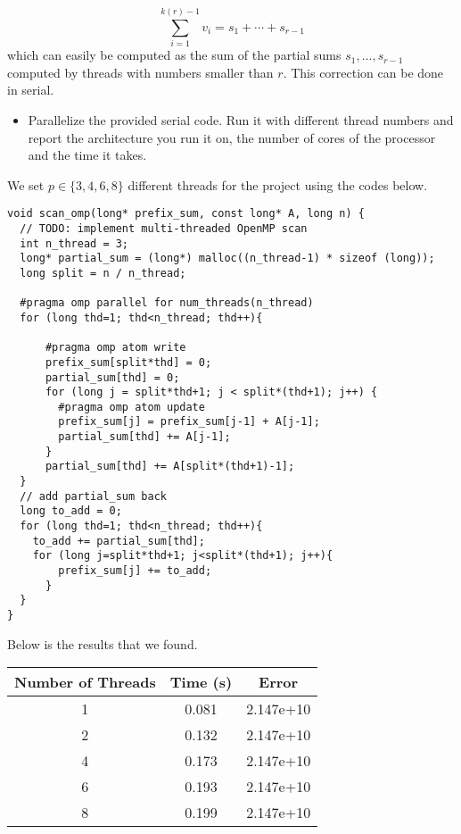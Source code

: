 \documentclass[12pt]{article}
\begin{document}
\begin{enumerate}
    $$
    \sum_{i=1}^{k(r)-1} v_i = s_1 + \cdots + s_{r-1}
    $$
    which can easily be computed as the sum of the partial sums
    $s_1,\ldots,s_{r-1}$ computed by threads with numbers smaller than
    $r$.  This correction can be done in serial.
    \begin{itemize}
    \item Parallelize the provided serial code. Run it with different
      thread numbers and report the architecture you run it on, the
      number of cores of the processor and the time it takes.
    \end{itemize}
\newpage
We set $p\in\{3,4,6,8\}$ different threads for the project using the codes below.
\begin{verbatim}
void scan_omp(long* prefix_sum, const long* A, long n) {
  // TODO: implement multi-threaded OpenMP scan
  int n_thread = 3;
  long* partial_sum = (long*) malloc((n_thread-1) * sizeof (long));
  long split = n / n_thread;
  
  #pragma omp parallel for num_threads(n_thread)
  for (long thd=1; thd<n_thread; thd++){
  	
  	  #pragma omp atom write
  	  prefix_sum[split*thd] = 0;
  	  partial_sum[thd] = 0;
	  for (long j = split*thd+1; j < split*(thd+1); j++) {
	  	#pragma omp atom update
	    prefix_sum[j] = prefix_sum[j-1] + A[j-1];
	    partial_sum[thd] += A[j-1];
	  }
	  partial_sum[thd] += A[split*(thd+1)-1]; 
  } 
  // add partial_sum back
  long to_add = 0;
  for (long thd=1; thd<n_thread; thd++){
  	to_add += partial_sum[thd];
  	for (long j=split*thd+1; j<split*(thd+1); j++){
  		prefix_sum[j] += to_add;
	  }
  }
}
\end{verbatim}
Below is the results that we found.
\begin{center}
\begin{tabular}{|c|c|c|}
\hline
Number of Threads & Time (s)& Error \\
\hline
1 & 0.081 & 2.147e+10 \\
\hline
2 & 0.132 & 2.147e+10 \\
\hline
4 & 0.173 & 2.147e+10 \\
\hline
6 & 0.193 & 2.147e+10 \\
\hline
8 & 0.199 & 2.147e+10 \\
\hline
\end{tabular}
\end{center}
\end{enumerate}
\end{document}
